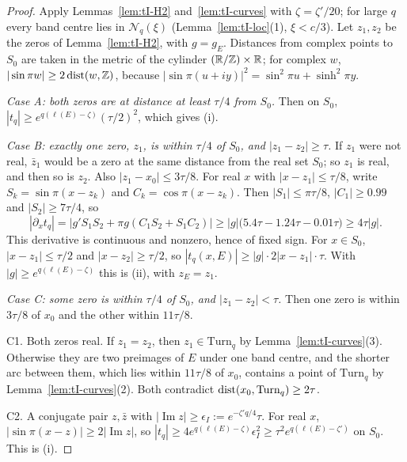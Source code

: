 \begin{proof}
Apply Lemmas~\ref{lem:tI-H2} and~\ref{lem:tI-curves} with $\zeta=\zeta'/20$; for large $q$ every band centre lies in $\mathcal N_q(\xi)$ (Lemma~\ref{lem:tI-loc}(1), $\xi<c/3$). Let $z_1,z_2$ be the zeros of Lemma~\ref{lem:tI-H2}, with $g=g_E$. Distances from complex points to $S_0$ are taken in the metric of the cylinder $(\mathbb R/\mathbb Z)\times\mathbb R$; for complex $w$, $|\sin\pi w|\ge2\operatorname{dist}(w,\mathbb Z)$, because $|\sin\pi(u+iy)|^2=\sin^2\pi u+\sinh^2\pi y$.

\emph{Case A: both zeros are at distance at least $\tau/4$ from $S_0$.} Then on $S_0$, $|t_q|\ge e^{q(\ell(E)-\zeta)}(\tau/2)^2$, which gives (i).

\emph{Case B: exactly one zero, $z_1$, is within $\tau/4$ of $S_0$, and $|z_1-z_2|\ge\tau$.} If $z_1$ were not real, $\bar z_1$ would be a zero at the same distance from the real set $S_0$; so $z_1$ is real, and then so is $z_2$. Also $|z_1-x_0|\le3\tau/8$. For real $x$ with $|x-z_1|\le\tau/8$, write $S_k=\sin\pi(x-z_k)$ and $C_k=\cos\pi(x-z_k)$. Then $|S_1|\le\pi\tau/8$, $|C_1|\ge0.99$ and $|S_2|\ge7\tau/4$, so
\[
|\partial_xt_q|=|g'S_1S_2+\pi g(C_1S_2+S_1C_2)|\ge|g|\bigl(5.4\tau-1.24\tau-0.01\tau\bigr)\ge4\tau|g|.
\]
This derivative is continuous and nonzero, hence of fixed sign. For $x\in S_0$, $|x-z_1|\le\tau/2$ and $|x-z_2|\ge\tau/2$, so $|t_q(x,E)|\ge|g|\cdot2|x-z_1|\cdot\tau$. With $|g|\ge e^{q(\ell(E)-\zeta)}$ this is (ii), with $z_E=z_1$.

\emph{Case C: some zero is within $\tau/4$ of $S_0$, and $|z_1-z_2|<\tau$.} Then one zero is within $3\tau/8$ of $x_0$ and the other within $11\tau/8$.

C1. Both zeros real. If $z_1=z_2$, then $z_1\in\mathrm{Turn}_q$ by Lemma~\ref{lem:tI-curves}(3). Otherwise they are two preimages of $E$ under one band centre, and the shorter arc between them, which lies within $11\tau/8$ of $x_0$, contains a point of $\mathrm{Turn}_q$ by Lemma~\ref{lem:tI-curves}(2). Both contradict $\operatorname{dist}(x_0,\mathrm{Turn}_q)\ge2\tau$.

C2. A conjugate pair $z,\bar z$ with $|\operatorname{Im}z|\ge\epsilon_I:=e^{-\zeta'q/4}\tau$. For real $x$, $|\sin\pi(x-z)|\ge2|\operatorname{Im}z|$, so $|t_q|\ge4e^{q(\ell(E)-\zeta)}\epsilon_I^2\ge\tau^2e^{q(\ell(E)-\zeta')}$ on $S_0$. This is (i).


\end{proof}
